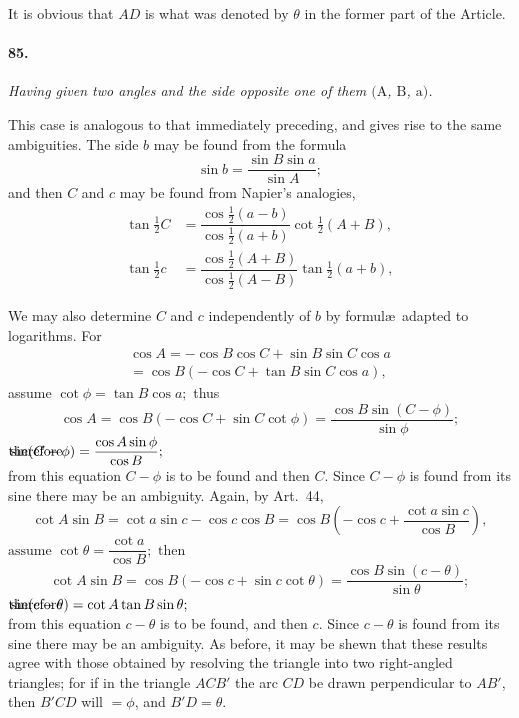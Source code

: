 \documentclass{book}[2004/02/16]
\begin{document}
\begin{mainmatter}
\begin{spacing}{1.3}
It is obvious that $AD$ is what was denoted by $\theta$ in the former
part of the Article.

\paragraph{85.} \textit{Having given two angles and the side opposite one of them
$(\mathrm A$, $\mathrm B$, $\mathrm a)$.}

This case is analogous to that immediately preceding, and
gives rise to the same ambiguities. The side $b$ may be found from
the formula
\[
  \sin b=\dfrac{\sin B \sin a}{\sin A};
\]
and then $C$ and $c$ may be found from Napier's analogies,
\begin{align*}
  \tan \tfrac{1}{2}C
&= \dfrac{\cos\tfrac{1}{2}(a-b)}
        {\cos\tfrac{1}{2}(a+b)} \cot\tfrac{1}{2}(A+B),
\\[1ex]
  \tan \tfrac{1}{2}c
&= \dfrac{\cos\tfrac{1}{2}(A+B)}
        {\cos\tfrac{1}{2}(A-B)} \tan\tfrac{1}{2}(a+b),
\end{align*}

We may also determine $C$ and $c$ independently of $b$ by formul\ae\
adapted to logarithms. For
\begin{multline*}
  \cos A= -\cos B\cos C + \sin B\sin C\cos a \\
= \cos B (-\cos C + \tan B\sin C \cos a),
\end{multline*}
assume $\cot \phi=\tan B \cos a;$ thus
\[
  \cos A = \cos B(-\cos C + \sin C \cot \phi)
= \dfrac{\cos B\sin(C - \phi)}{\sin \phi};
\]
$\rlap{therefore }\hfill\displaystyle
  \sin(C - \phi)=\dfrac{\cos A \sin \phi}{\cos B}; \hfill$ \\[1ex]
from this equation $C-\phi$ is to be found and then $C$. Since $C-\phi$
is found from its sine there may be an ambiguity. Again, by
Art.~44,
\[
\cot A \sin B = \cot a \sin c - \cos c \cos B =
\cos B \left(- \cos c + \dfrac{\cot a \sin c}{\cos B}\right),
\]
$\text{assume } \cot \theta = \dfrac{\cot a}{\cos B}; \text{ then}$
\[
\cot A \sin B = \cos B (- \cos c + \sin c \cot \theta) =
\frac{\cos B \sin (c - \theta)}{\sin \theta};
\]
$\rlap{therefore }\hfill
\sin (c - \theta) = \cot A \tan B \sin \theta;
\hfill$\\[1ex]
from this equation $c - \theta$ is to be found, and then $c$. Since $c - \theta$ is
found from its sine there may be an ambiguity. As before, it may
be shewn that these results agree with those obtained by resolving
the triangle into two right-angled triangles; for if in the triangle
$ACB'$ the arc $CD$ be drawn perpendicular to $AB'$, then $B'CD$
will $=\phi$, and $B'D = \theta$.


\end{spacing}
\end{mainmatter}
\end{document}
